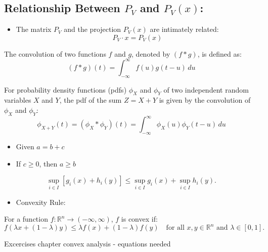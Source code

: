 \documentclass{article}
\begin{document}
\subsection{Relationship Between $P_V$ and $P_V(x)$:}
\begin{itemize}
    \item The matrix $P_V$ and the projection $P_V(x)$ are intimately related:
    \[
    P_V \cdot x = P_V(x)
    \]
\end{itemize}

The convolution of two functions $f$ and $g$, denoted by $(f * g)$, is defined as:
\[
(f * g)(t) = \int_{-\infty}^{\infty} f(u)g(t - u) \, du
\]

For probability density functions (pdfs) $\phi_X$ and $\phi_Y$ of two independent random variables $X$ and $Y$, the pdf of the sum $Z = X + Y$ is given by the convolution of $\phi_X$ and $\phi_Y$:
\[
\phi_{X+Y}(t) = \left( \phi_X * \phi_Y \right)(t) = \int_{-\infty}^{\infty} \phi_X(u)\phi_Y(t - u) \, du
\]











\begin{itemize}
    \item Given \( a = b + c \)
    \item If \( c \geq 0 \), then \( a \geq b \)
\end{itemize}

\[
\sup_{i \in I} [g_i(x) + h_i(y)] \leq \sup_{i \in I} g_i(x) + \sup_{i \in I} h_i(y).
\]

\begin{itemize}
    \item Convexity Rule:
\end{itemize}
For a function \( f : \mathbb{R}^n \to (-\infty, \infty) \), \( f \) is convex if:
\[
f(\lambda x + (1 - \lambda)y) \leq \lambda f(x) + (1 - \lambda) f(y) \quad \text{for all } x, y \in \mathbb{R}^n \text{ and } \lambda \in [0, 1].
\]

\noindent Excercises chapter convex analysis - equations needed
\end{document}
